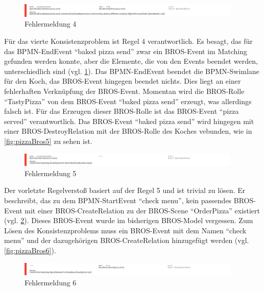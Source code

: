 \begin{figure}[H]
    \centering
    \includegraphics[width=0.95\textwidth,keepaspectratio]{../images/example/error4.png}%
    \caption{Fehlermeldung 4}%
    \label{fig:error4}
\end{figure}

Für das vierte Konsistenzproblem ist Regel 4 verantwortlich.
Es besagt, das für das BPMN-EndEvent ``baked pizza send'' zwar ein BROS-Event im Matching gefunden werden konnte, aber die Elemente, die von den Events beendet werden, unterschiedlich sind (vgl. \cref{fig:error4}).
Das BPMN-EndEvent beendet die BPMN-Swimlane für den Koch, das BROS-Event hingegen beendet nichts.
Dies liegt an einer fehlerhaften Verknüpfung der BROS-Event.
Momentan wird die BROS-Rolle ``TastyPizza'' von dem BROS-Event ``baked pizza send'' erzeugt, was allerdings falsch ist.
Für das Erzeugen dieser BROS-Rolle ist das BROS-Event ``pizza served'' verantwortlich.
Das BROS-Event ``baked pizza send'' wird hingegen mit einer BROS-DestroyRelation mit der BROS-Rolle des Koches vebunden, wie in \cref{fig:pizzaBros5} zu sehen ist.

\begin{figure}[H]
    \centering
    \includegraphics[width=0.95\textwidth,keepaspectratio]{../images/example/error5.png}%
    \caption{Fehlermeldung 5}%
    \label{fig:error5}
\end{figure}

Der vorletzte Regelverstoß basiert auf der Regel 5 und ist trivial zu lösen.
Er beschreibt, das zu dem BPMN-StartEvent ``check menu'', kein passendes BROS-Event mit einer BROS-CreateRelation zu der BROS-Scene ``OrderPizza'' existiert (vgl. \cref{fig:error5}).
Dieses BROS-Event wurde im bisherigen BROS-Model vergessen.
Zum Lösen des Konsistenzproblems muss ein BROS-Event mit dem Namen ``check menu'' und der dazugehörigen BROS-CreateRelation hinzugefügt werden (vgl. \cref{fig:pizzaBros6}).

\begin{figure}[H]
    \centering
    \includegraphics[width=0.95\textwidth,keepaspectratio]{../images/example/error6.png}%
    \caption{Fehlermeldung 6}%
    \label{fig:error6}
\end{figure}

